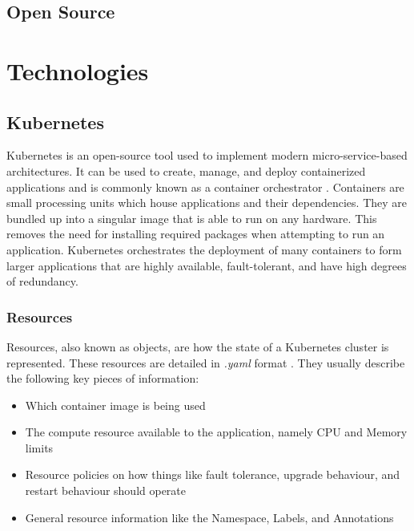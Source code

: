 \documentclass{article}
\begin{document}
\subsection{Open Source}



\section{Technologies} \label{technologies} 



\subsection{Kubernetes}

Kubernetes is an open-source tool used to implement modern micro-service-based architectures. It can be used to create, manage, and deploy containerized applications and is commonly known as a container orchestrator \cite{k8s-overview}. Containers are small processing units which house applications and their dependencies. They are bundled up into a singular image that is able to run on any hardware. This removes the need for installing required packages when attempting to run an application. Kubernetes orchestrates the deployment of many containers to form larger applications that are highly available, fault-tolerant, and have high degrees of redundancy.



\subsubsection{Resources} \label{resources}

Resources, also known as objects, are how the state of a Kubernetes cluster is represented. These resources are detailed in \emph{.yaml} format \cite{k8s-obj}. They usually describe the following key pieces of information:

\begin{itemize}
    \itemsep0em 
    \item Which container image is being used
    \item The compute resource available to the application, namely CPU and Memory limits
    \item Resource policies on how things like fault tolerance, upgrade behaviour, and restart behaviour should operate
    \item General resource information like the Namespace, Labels, and Annotations
\end{itemize}
\end{document}
